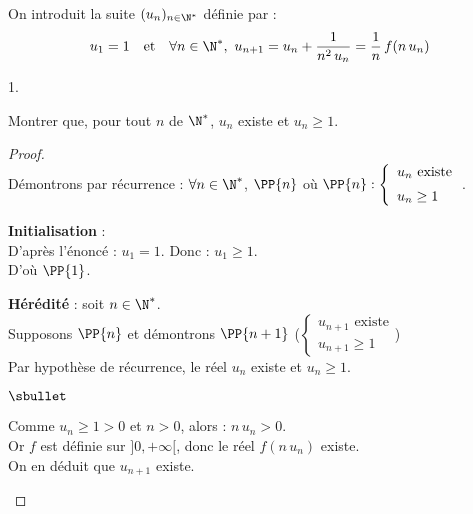 \documentclass[11pt]{article}%
\begin{document}
\noindent %
On introduit la suite $(u_n)_{n \in \N^*}$ définie par :
\[
  u_1 = 1 \quad \text{et} \quad \forall n \in \N^*, \ u_{n+1} = u_n +
  \dfrac{1}{n^2 \, u_n} = \dfrac{1}{n} \, f(n \, u_n)
\]
\begin{noliste}{1.}
  \setlength{\itemsep}{4mm}
  \setcounter{enumi}{7}
\item Montrer que, pour tout $n$ de $\N^*$, $u_n$ existe et $u_n \geq
  1$.
  \begin{proof}~\\ %
    Démontrons par récurrence : $\forall n \in \N^*$, $\PP{n}$ \quad
    où \quad $\PP{n} : \left\{
      \begin{array}{l}
        \text{$u_n$ existe}\\[.2cm]
        u_n \geq 1
      \end{array}
    \right. $.
    \begin{noliste}{\fitem}
    \item {\bf Initialisation} :\\ %
      D'après l'énoncé : $u_1 = 1$. Donc : $u_1 \geq 1$.\\ %
      D'où $\PP{1}$.
      
    \item {\bf Hérédité} : soit $n \in \N^*$.\\
      Supposons $\PP{n}$ et démontrons $\PP{n+1}$ (\ie $\left\{
        \begin{array}{l}
          \text{$u_{n+1}$ existe}\\[.2cm]
          u_{n+1} \geq 1
        \end{array}
      \right.$)\\[.1cm] %
      Par hypothèse de récurrence, le réel $u_n$ existe et $u_n \geq
      1$.
      \begin{noliste}{$\sbullet$}
      \item Comme $u_n \geq 1 >0$ et $n>0$, alors : $n \, u_n >0$.\\ %
        Or $f$ est définie sur $]0,+\infty[$, donc le réel $f(n \,
        u_n)$ existe.\\ %
        On en déduit que $u_{n+1}$ existe.


        \newpage
        

\end{noliste}
\end{noliste}
\end{proof}
\end{noliste}
\end{document}
